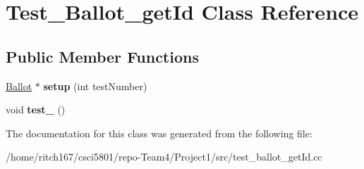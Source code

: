 \hypertarget{classTest__Ballot__getId}{}\section{Test\+\_\+\+Ballot\+\_\+get\+Id Class Reference}
\label{classTest__Ballot__getId}
\subsection*{Public Member Functions}
\begin{DoxyCompactItemize}
\item 
\mbox{\label{classTest__Ballot__getId_a14dd95a99f324c8bd0ddf26efa706c18}} 
\hyperlink{classBallot}{Ballot} $\ast$ {\bfseries setup} (int test\+Number)
\item 
\mbox{\label{classTest__Ballot__getId_a8b501f3ec59741ae2e39447f59770dc6}} 
void {\bfseries test\+\_} ()
\end{DoxyCompactItemize}


The documentation for this class was generated from the following file\+:\begin{DoxyCompactItemize}
\item 
/home/ritch167/csci5801/repo-\/\+Team4/\+Project1/src/test\+\_\+ballot\+\_\+get\+Id.\+cc\end{DoxyCompactItemize}
